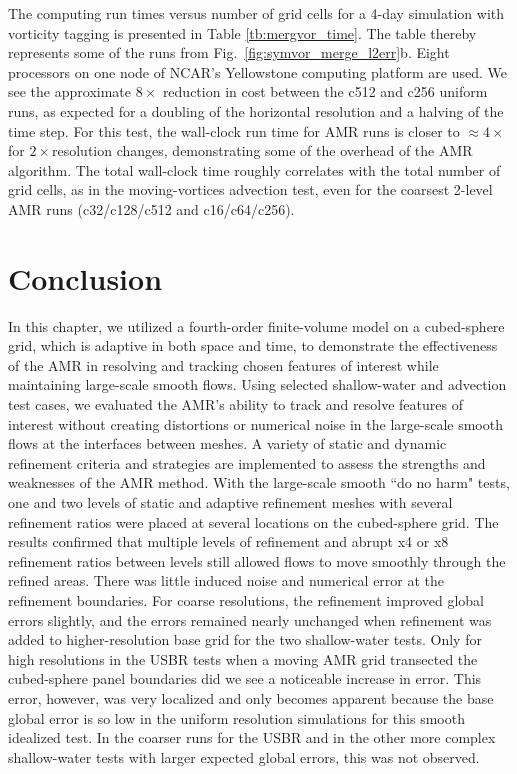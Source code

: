 The computing run times versus number of grid cells for a 4-day simulation with vorticity tagging
is presented in Table \ref{tb:mergvor_time}. The table thereby represents some of the runs from
Fig.~\ref{fig:symvor_merge_l2err}b. Eight processors on one node of NCAR's Yellowstone computing 
platform are used.
We see the approximate $8\times$ reduction in cost between the c512
and c256 uniform runs, as expected for a doubling of the horizontal resolution and a halving of the time step.
For this test, the wall-clock run time for AMR runs
is closer to $\approx 4\times$ for $2\times$resolution changes, 
demonstrating some of the overhead of the AMR algorithm.
The total wall-clock time roughly correlates with the total number 
of grid cells, as in the moving-vortices advection test,
even for the coarsest 2-level AMR runs (c32/c128/c512 and c16/c64/c256).

\section{Conclusion}
\label{sec:conclusion}

In this chapter, we utilized a fourth-order
finite-volume model on a cubed-sphere grid, which is adaptive in both
space and time, to demonstrate the effectiveness of the AMR in resolving
and tracking chosen features of interest while maintaining large-scale
smooth flows.  Using selected shallow-water and advection test cases, we
evaluated the AMR's ability to track and resolve features of interest
without creating distortions or numerical noise in the large-scale
smooth flows at the interfaces between meshes.  A variety of static and
dynamic refinement criteria and strategies are implemented to assess the
strengths and weaknesses of the AMR method.  With the large-scale smooth
``do no harm" tests, one and two levels of static and adaptive
refinement meshes with several refinement ratios were placed at several
locations on the cubed-sphere grid.  The results confirmed that multiple
levels of refinement and abrupt x4 or x8 refinement ratios between
levels still allowed flows to move smoothly through the refined areas.
There was little induced noise and numerical error at the refinement
boundaries.  For coarse resolutions, the refinement improved global
errors slightly, and the errors remained nearly unchanged when refinement
was added to higher-resolution base grid for the two shallow-water
tests.  Only for high resolutions in the USBR tests when a moving AMR
grid transected the cubed-sphere panel boundaries did we see a
noticeable increase in error.  This error, however, was very localized
and only becomes apparent because the base global error is so low in the
uniform resolution simulations for this smooth idealized test.  In the
coarser runs for the USBR and in the other more complex shallow-water
tests with larger expected global errors, this was not observed.

